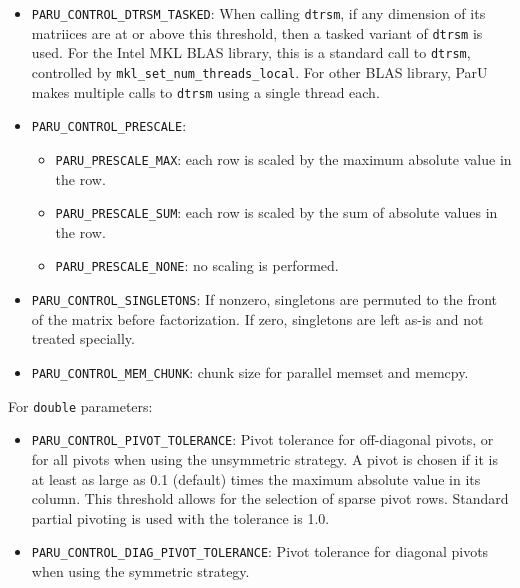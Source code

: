 \documentclass[12pt]{article}
\begin{document}
\begin{itemize}
    \item \verb'PARU_CONTROL_DTRSM_TASKED': %
        When calling \verb'dtrsm', if any dimension of its matriices are at or
        above this threshold, then a tasked variant of \verb'dtrsm' is used.
        For the Intel MKL BLAS library, this is a standard call to
        \verb'dtrsm', controlled by \verb'mkl_set_num_threads_local'.  For
        other BLAS library, ParU makes multiple calls to \verb'dtrsm' using a
        single thread each.

    \item \verb'PARU_CONTROL_PRESCALE': %

        \begin{itemize}
        \item \verb'PARU_PRESCALE_MAX':  each row is scaled by
        the maximum absolute value in the row.
        \item \verb'PARU_PRESCALE_SUM':  each row is scaled by
        the sum of absolute values in the row.
        \item \verb'PARU_PRESCALE_NONE': no scaling is performed.
        \end{itemize}

    \item \verb'PARU_CONTROL_SINGLETONS': %
        If nonzero, singletons are permuted to the front of the matrix before
        factorization.  If zero, singletons are left as-is and not treated
        specially.

    \item \verb'PARU_CONTROL_MEM_CHUNK': %
        chunk size for parallel memset and memcpy.
    \end{itemize}

    For \verb'double' parameters:

    \begin{itemize}
    \item \verb'PARU_CONTROL_PIVOT_TOLERANCE': %
        Pivot tolerance for off-diagonal pivots, or for all pivots when using
        the unsymmetric strategy.  A pivot is chosen if it is at least as large
        as 0.1 (default) times the maximum absolute value in its column.  This
        threshold allows for the selection of sparse pivot rows.  Standard
        partial pivoting is used with the tolerance is 1.0.

    \item \verb'PARU_CONTROL_DIAG_PIVOT_TOLERANCE': %
        Pivot tolerance for diagonal pivots when using the symmetric strategy.

    \end{itemize}
\end{document}
